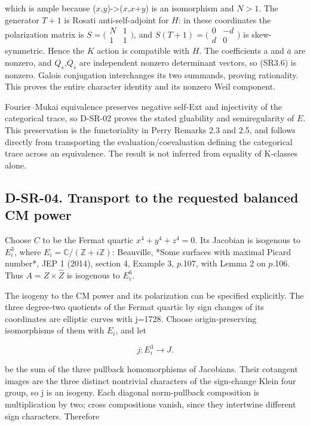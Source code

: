 which is ample because (\(x\),\(y\))-\textgreater{}(\(x\),\(x\)+\(y\)) is an isomorphism and \(N> 1\). The generator \(T+1\) is Rosati anti-self-adjoint for \(H\): in these coordinates the polarization matrix is \(S=\bigl(\begin{smallmatrix}N&1\\1&1\end{smallmatrix}\bigr)\), and \(S(T+1)=\bigl(\begin{smallmatrix}0&-d\\d&0\end{smallmatrix}\bigr)\) is skew-symmetric. Hence the \(K\) action is compatible with \(H\). The coefficients a and \(\bar a\) are nonzero, and \(Q_s\),\(Q_{\bar s}\) are independent nonzero determinant vectors, so (SR3.6) is nonzero. Galois conjugation interchanges its two summands, proving rationality. This proves the entire character identity and its nonzero Weil component.

Fourier--Mukai equivalence preserves negative self-Ext and injectivity of the categorical trace, so D-SR-02 proves the stated gluability and semiregularity of \(E\). This preservation is the functoriality in Perry Remarks 2.3 and 2.5, and follows directly from transporting the evaluation/coevaluation defining the categorical trace across an equivalence. The result is not inferred from equality of K-classes alone. \cite{SR-Perry2026}

\subsection{D-SR-04. Transport to the requested balanced CM power}
\label{D-SR-04}

Choose \(C\) to be the Fermat quartic \(x^4+y^4+z^4=0\). Its Jacobian is isogenous to \(E_i^3\), where \(E_i=\mathbb C/(\mathbb Z+i\mathbb Z)\): Beauville, *Some surfaces with maximal Picard number*, JEP 1 (2014), section 4, Example 3, \(p\).107, with Lemma 2 on \(p\).106. Thus \(A=Z\times\widehat Z\) is isogenous to \(E_i^6\). \cite{SR-Beauville2014}

The isogeny to the CM power and its polarization can be specified explicitly. The three degree-two quotients of the Fermat quartic by sign changes of its coordinates are elliptic curves with j=1728. Choose origin-preserving isomorphisms of them with \(E_i\), and let

\[
j:E_i^3\longrightarrow J.
\]

be the sum of the three pullback homomorphisms of Jacobians. Their cotangent images are the three distinct nontrivial characters of the sign-change Klein four group, so j is an isogeny. Each diagonal norm-pullback composition is multiplication by two; cross compositions vanish, since they intertwine different sign characters. Therefore

